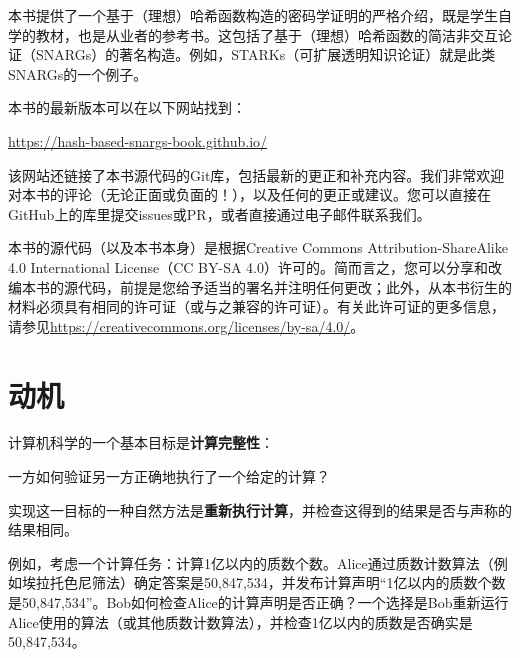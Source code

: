 \documentclass[american,singlepageview]{snargs-book-zh}
\begin{document}
本书提供了一个基于（理想）哈希函数构造的密码学证明的严格介绍，既是学生自学的教材，也是从业者的参考书。这包括了基于（理想）哈希函数的简洁非交互论证（SNARGs）的著名构造。例如，STARKs（可扩展透明知识论证）就是此类SNARGs的一个例子。

本书的最新版本可以在以下网站找到：
\begin{center}
\url{https://hash-based-snargs-book.github.io/}
\end{center}
该网站还链接了本书源代码的Git库，包括最新的更正和补充内容。我们非常欢迎对本书的评论（无论正面或负面的！），以及任何的更正或建议。您可以直接在GitHub上的库里提交issues或PR，或者直接通过电子邮件联系我们。

本书的源代码（以及本书本身）是根据\textsf{Creative Commons Attribution-ShareAlike 4.0 International License}（CC BY-SA 4.0）许可的。简而言之，您可以分享和改编本书的源代码，前提是您给予适当的署名并注明任何更改；此外，从本书衍生的材料必须具有相同的许可证（或与之兼容的许可证）。有关此许可证的更多信息，请参见\url{https://creativecommons.org/licenses/by-sa/4.0/}。
\section[nonumber=true]{动机}

计算机科学的一个基本目标是\textbf{计算完整性}：
\begin{center}
一方如何验证另一方正确地执行了一个给定的计算？
\end{center}
实现这一目标的一种自然方法是\textbf{重新执行计算}，并检查这得到的结果是否与声称的结果相同。

例如，考虑一个计算任务：计算1亿以内的质数个数。Alice通过质数计数算法（例如埃拉托色尼筛法）确定答案是{50,847,534}，并发布计算声明“1亿以内的质数个数是{50,847,534}”。Bob如何检查Alice的计算声明是否正确？一个选择是Bob重新运行Alice使用的算法（或其他质数计数算法），并检查1亿以内的质数是否确实是{50,847,534}。
\end{document}
